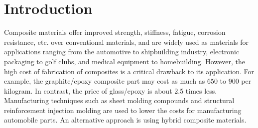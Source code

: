 \section{Introduction}
Composite materials offer improved strength, stiffness, fatigue, corrosion resistance, etc. over
conventional materials, and are widely used as materials for applications ranging from the automotive to shipbuilding
industry, electronic packaging to golf clubs, and medical equipment to homebuilding. However, the high
cost of fabrication of composites is a critical drawback to its application. For example, the
graphite/epoxy composite part may cost as much as $650$ to $900$ per kilogram. In contrast, the price
of glass/epoxy is about 2.5 times less. Manufacturing techniques such as sheet molding compounds and
structural reinforcement injection molding are used to lower the  costs for manufacturing automobile parts.
An alternative approach is using hybrid composite materials.


